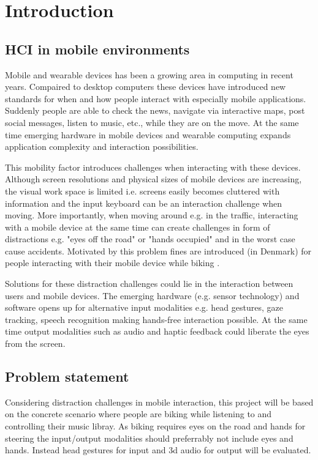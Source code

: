 \chapter{Introduction}
\section{HCI in mobile environments}
Mobile and wearable devices has been a growing area in computing in recent years. Compaired to desktop computers these devices have introduced new standards for when and how people interact with especially mobile applications. Suddenly people are able to check the news, navigate via interactive maps, post social messages, listen to music, etc., while they are on the move. At the same time emerging hardware in mobile devices and wearable computing expands application complexity and interaction possibilities.

This mobility factor introduces challenges when interacting with these devices. Although screen resolutions and physical sizes of mobile devices are increasing, the visual work space is limited i.e. screens easily becomes cluttered with information and the input keyboard can be an interaction challenge when moving. More importantly, when moving around e.g. in the traffic, interacting with a mobile device at the same time can create challenges in form of distractions e.g. "eyes off the road" or "hands occupied" and in the worst case cause accidents. Motivated by this problem fines are introduced (in Denmark) for people interacting with their mobile device while biking \cite{cyklistforbundet_bodetakster_2014}.

Solutions for these distraction challenges could lie in the interaction between users and mobile devices. The emerging hardware (e.g. sensor technology) and software opens up for alternative input modalities e.g. head gestures, gaze tracking, speech recognition making hands-free interaction possible. At the same time output modalities such as audio and haptic feedback could liberate the eyes from the screen.

\section{Problem statement}
Considering distraction challenges in mobile interaction, this project will be based on the concrete scenario where people are biking while listening to and controlling their music libray. As biking requires eyes on the road and hands for steering the input/output modalities should preferrably not include eyes and hands. Instead head gestures for input and 3d audio for output will be evaluated.

